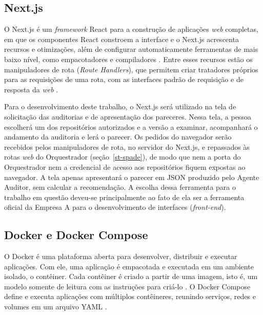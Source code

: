 \subsection{Next.js}
\label{st-nextjs}

O Next.js é um \textit{framework} React para a construção de aplicações \textit{web} completas, em que os componentes React constroem a interface e o Next.js acrescenta recursos e otimizações, além de configurar automaticamente ferramentas de mais baixo nível, como empacotadores e compiladores \cite{nextjsDocs}. Entre esses recursos estão os manipuladores de rota (\textit{Route Handlers}), que permitem criar tratadores próprios para as requisições de uma rota, com as interfaces padrão de requisição e de resposta da \textit{web} \cite{nextjsRouteHandlers}.

Para o desenvolvimento deste trabalho, o Next.js será utilizado na tela de solicitação das auditorias e de apresentação dos pareceres. Nessa tela, a pessoa escolherá um dos repositórios autorizados e a versão a examinar, acompanhará o andamento da auditoria e lerá o parecer. Os pedidos do navegador serão recebidos pelos manipuladores de rota, no servidor do Next.js, e repassados às rotas \textit{web} do Orquestrador (seção~\ref{st-spade}), de modo que nem a porta do Orquestrador nem a credencial de acesso aos repositórios fiquem expostas ao navegador. A tela apenas apresentará o parecer em JSON produzido pelo Agente Auditor, sem calcular a recomendação. A escolha dessa ferramenta para o trabalho em questão deveu-se principalmente ao fato de ela ser a ferramenta oficial da Empresa A para o desenvolvimento de interfaces (\textit{front-end}).

\subsection{Docker e Docker Compose}
\label{st-docker}

O Docker é uma plataforma aberta para desenvolver, distribuir e executar aplicações. Com ele, uma aplicação é empacotada e executada em um ambiente isolado, o contêiner. Cada contêiner é criado a partir de uma imagem, isto é, um modelo somente de leitura com as instruções para criá-lo \cite{dockerOverview}. O Docker Compose define e executa aplicações com múltiplos contêineres, reunindo serviços, redes e volumes em um arquivo YAML \cite{dockerCompose}.


